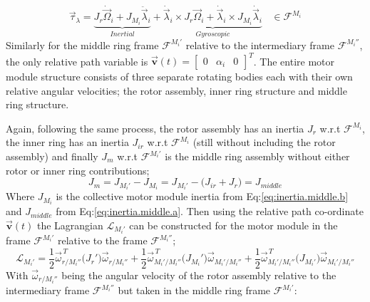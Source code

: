 \begin{equation}\label{eq:torque-induced-inner}
\vec{\tau}_\lambda=\underbrace{J_r\dot{\vec{\Omega}}_i+J_{M_i}\ddot{\vec{\lambda}}_i}_{Inertial}+\underbrace{\dot{\vec{\lambda}}_i\times J_r\vec{\Omega}_i+\dot{\vec{\lambda}}_i\times J_{M_i}\dot{\vec{\lambda}}_i}_{Gyroscopic}~~~~\in\mathcal{F}^{M_i}
\end{equation}
Similarly for the middle ring frame $\mathcal{F}^{M_i'}$ relative to the intermediary frame $\mathcal{F}^{M_i''}$, the only relative path variable is $\vec{\mathbf{v}}(t)=\begin{bmatrix}0 & \alpha_i & 0\end{bmatrix}^T$. The entire motor module structure consists of three separate rotating bodies each with their own relative angular velocities; the rotor assembly, inner ring structure and middle ring structure.
\par
Again, following the same process, the rotor assembly has an inertia $J_r$ w.r.t $\mathcal{F}^{M_i}$, the inner ring has an inertia $J_{ir}$ w.r.t $\mathcal{F}^{M_i}$ (still without including the rotor assembly) and finally $J_m$ w.r.t $\mathcal{F}^{M_i'}$ is the middle ring assembly without either rotor or inner ring contributions;
\begin{equation}
J_m=J_{M_i'}-J_{M_i}=J_{M_i'}-\big(J_{ir}+J_{r}\big)=J_{middle}
\end{equation}
Where $J_{M_i}$ is the collective motor module inertia from Eq:\ref{eq:inertia.middle.b} and $J_{middle}$ from Eq:\ref{eq:inertia.middle.a}. Then using the relative path co-ordinate $\vec{\mathbf{v}}(t)$ the Lagrangian $\mathcal{L}_{M_i'}$ can be constructed for the motor module in the frame $\mathcal{F}^{M_i'}$ relative to the frame $\mathcal{F}^{M_i''}$;
\begin{equation}\label{eq:alpha-lagrange}
\mathcal{L}_{M_i'}=\frac{1}{2}\vec{\omega}_{r/M_i''}^{\hspace{2pt}T}\big(J_{r}'\big)\vec{\omega}_{r/M_i''}+\frac{1}{2}\vec{\omega}_{M_i'/M_i''}^{\hspace{2pt}T}\big(J_{M_i}'\big)\vec{\omega}_{M_i'/M_i''}+\frac{1}{2}\vec{\omega}_{M_i'/M_i''}^{\hspace{2pt}T}\big(J_{M_i'}\big)\vec{\omega}_{M_i'/M_i''}
\end{equation}
With $\vec{\omega}_{r/M_i''}$ being the angular velocity of the rotor assembly relative to the intermediary frame $\mathcal{F}^{M_i''}$ but taken in the middle ring frame $\mathcal{F}^{M_i'}$:
